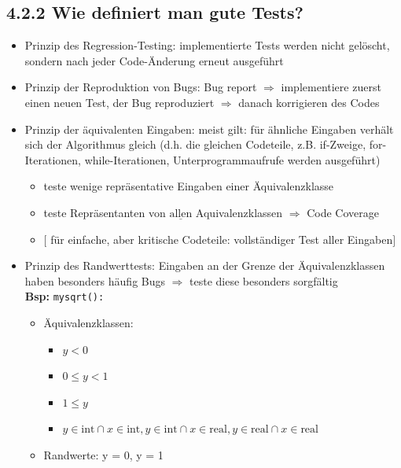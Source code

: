 \documentclass[11pt, fleqn]{scrreprt}
\begin{document}
\subsection*{4.2.2 Wie definiert man gute Tests?}
\begin{itemize}
    \item Prinzip des Regression-Testing: implementierte Tests werden nicht gelöscht, sondern nach jeder Code-Änderung erneut ausgeführt
    \item Prinzip der Reproduktion von Bugs: Bug report $\Rightarrow$ implementiere zuerst einen neuen Test, der Bug reproduziert $\Rightarrow$ danach korrigieren des Codes
    \item Prinzip der äquivalenten Eingaben: meist gilt: für ähnliche Eingaben verhält sich der Algorithmus gleich (d.h. die gleichen Codeteile, z.B. if-Zweige, for-Iterationen, while-Iterationen, Unterprogrammaufrufe werden ausgeführt)
    \begin{itemize}[label={$\Rightarrow$}]
        \item teste wenige repräsentative Eingaben einer Äquivalenzklasse
        \item teste Repräsentanten von $\underline{\text{allen}}$ Aquivalenzklassen $\Rightarrow$ Code Coverage
        \item[] $\lbrack$ für einfache, aber kritische Codeteile: vollständiger Test aller Eingaben$\rbrack$
    \end{itemize}
    \item Prinzip des Randwerttests: Eingaben an der Grenze der Äquivalenzklassen haben besonders häufig Bugs $\Rightarrow$ teste diese besonders sorgfältig \\
    \textbf{Bsp:} \verb|mysqrt(): |
    \begin{itemize}
        \item Äquivalenzklassen:
        \begin{itemize}
            \item $y < 0$
            \item $0 \leq y < 1$
            \item $1 \leq y$
            \item $y \in \text{int} \cap x \in \text{int}, y \in \text{int} \cap x \in \text{real}, y \in \text{real}\cap x \in \text{real}$
            \end{itemize}
            \item Randwerte: y = 0, y = 1
            \end{itemize}

\end{itemize}
\end{document}
